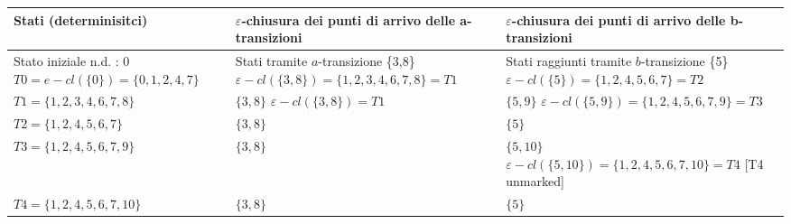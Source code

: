 \documentclass{standalone}
\providecommand\lightrule{%
	\arrayrulecolor{black!30}%
	\midrule[\lightrulewidth]%
	\arrayrulecolor{black}}
\begin{document}
\begin{tabularx}{\textwidth}{XXX}
		Stati (determinisitci) & \(\varepsilon\)-chiusura dei punti di arrivo delle a-transizioni & \(\varepsilon\)-chiusura dei punti di arrivo delle b-transizioni \\
    \midrule
        Stato iniziale n.d. : 0 \newline
        \(T0 = e-cl(\{0\}) = \{0, 1, 2, 4, 7\}\)
        &
        Stati tramite \(a\)-transizione \{3,8\} \newline
        \(\varepsilon-cl(\{3,8\}) = \{1,2,3,4,6,7,8\} = T1\) \newline
        [T1 unmarked]
        &
        Stati raggiunti tramite \(b\)-transizione \{5\} \newline
        \(\varepsilon-cl(\{5\}) = \{1,2,4,5,6,7\} = T2\) \newline
        [T2 unmarked]
        \\ \lightrule
        \(T1 = \{1,2,3,4,6,7,8\}\)
        &
        \(\{3, 8\}\) \newline
        \(\varepsilon-cl(\{3,8\}) = T1\) 
        &
        \(\{5, 9\}\) \newline
        \(\varepsilon-cl(\{5,9\}) = \{1,2,4,5,6,7,9\} = T3\) \newline
        [T3 unmarked]
        \\ \lightrule
        \(T2 = \{1,2,4,5,6,7\}\)
        &
        \(\{3,8\}\) 
        &
        \(\{5\}\) 
        \\ \lightrule
        \(T3 = \{1,2,4,5,6,7,9\}\)
        &
        \(\{3,8\}\) 
        &
        \(\{5, 10\}\) \newline
        \(\varepsilon-cl(\{5, 10\}) = \{1,2,4,5,6,7,10\} = T4\)
        [T4 unmarked]
        \\ \lightrule
        \(T4 = \{1,2,4,5,6,7,10\}\)
        &
        \(\{3,8\}\) 
        &
        \(\{5\}\) 
        \\
\end{tabularx}
\end{document}
